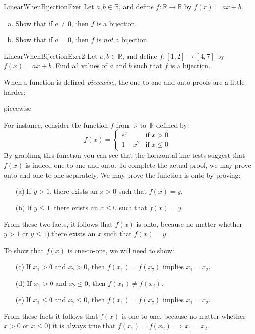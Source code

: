 \begin{exercise}{LinearWhenBijectionExer}
Let $a,b \in \mathbb{R}$, and define $f \colon \mathbb{R} \to \mathbb{R}$ by $f(x) = a x + b$. 
\begin{enumerate}[(a)]
\item \label{LinearWhenBijectionExer-not0}
Show that if $a \neq 0$, then $f$ is a bijection.
\item \label{LinearWhenBijectionExer-0}
Show that if $a = 0$, then $f$ is \emph{not} a bijection.
\end{enumerate}
\end{exercise}

\begin{exercise}{LinearWhenBijectionExer2}
Let $a,b \in \mathbb{R}$, and define $f \colon [1,2] \to [4,7]$ by $f(x) = a x + b$. 
Find all values of $a$ and $b$ such that $f$ is a bijection.
\end{exercise}


When a function is defined \emph{piecewise}, the one-to-one and  onto proofs are a little harder:

\begin{example}{piecewise}

  For instance, consider the function $f$ from~$\mathbb{R}$ to~$\mathbb{R}$ defined by:
$$ f(x) = 
\begin{cases}
e^x & \mbox{if $x > 0$} \\
1 - x^2 & \mbox{if $x \le 0$}
\end{cases} $$
By graphing this function you can see that the horizontal line tests suggest that  $f(x)$ is indeed one-to-one and onto. To complete the actual proof, we may prove onto and one-to-one separately. We may prove the function is onto by proving:
\begin{enumerate}[(a)] 
\item[(a)]
If $y > 1$, there exists an $x>0$ such that $f(x) = y$.
\item[(b)]
If $y \le 1$, there exists an $x \le 0$ such that $f(x) = y$.
\end{enumerate}
From these two facts, it follows that $f(x)$ is onto, because no matter whether $y>1$ or $y \le 1$) there exists an $x$ such that $f(x)=y$. 
\bigskip


To show that $f(x)$ is one-to-one, we will need to show:
\begin{enumerate}[(a)]
\setcounter{enumi}{2} 
\item[(c)]
If $x_1 > 0$ and $x_2>0$, then $f(x_1) = f(x_2)$ implies $x_1=x_2$.
\item[(d)]
If $x_1 > 0$ and $x_2 \le 0$, then $f(x_1) \neq f(x_2)$.
\item[(e)]
If $x_1 \le 0$ and $x_2 \le 0$, then $f(x_1)=f(x_2)$ implies $x_1=x_2$.
\end{enumerate}
From these facts it follows that $f(x)$ is one-to-one, because no matter whether $x>0$ or $x \le 0$) it is always true that $f(x_1) = f(x_2) \implies x_1=x_2$. 
\end{example}
 
